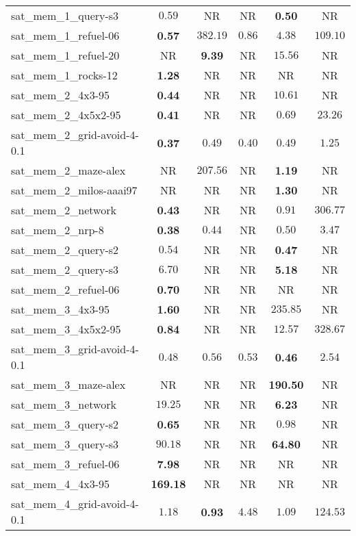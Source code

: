 \begin{tabular}{lccccc}
sat\_mem\_1\_query-s3 & $0.59$ & NR & NR & \textbf{0.50} & NR \\
sat\_mem\_1\_refuel-06 & \textbf{0.57} & $382.19$ & $0.86$ & $4.38$ & $109.10$ \\
sat\_mem\_1\_refuel-20 & NR & \textbf{9.39} & NR & $15.56$ & NR \\
sat\_mem\_1\_rocks-12 & \textbf{1.28} & NR & NR & NR & NR \\
sat\_mem\_2\_4x3-95 & \textbf{0.44} & NR & NR & $10.61$ & NR \\
sat\_mem\_2\_4x5x2-95 & \textbf{0.41} & NR & NR & $0.69$ & $23.26$ \\
sat\_mem\_2\_grid-avoid-4-0.1 & \textbf{0.37} & $0.49$ & $0.40$ & $0.49$ & $1.25$ \\
sat\_mem\_2\_maze-alex & NR & $207.56$ & NR & \textbf{1.19} & NR \\
sat\_mem\_2\_milos-aaai97 & NR & NR & NR & \textbf{1.30} & NR \\
sat\_mem\_2\_network & \textbf{0.43} & NR & NR & $0.91$ & $306.77$ \\
sat\_mem\_2\_nrp-8 & \textbf{0.38} & $0.44$ & NR & $0.50$ & $3.47$ \\
sat\_mem\_2\_query-s2 & $0.54$ & NR & NR & \textbf{0.47} & NR \\
sat\_mem\_2\_query-s3 & $6.70$ & NR & NR & \textbf{5.18} & NR \\
sat\_mem\_2\_refuel-06 & \textbf{0.70} & NR & NR & NR & NR \\
sat\_mem\_3\_4x3-95 & \textbf{1.60} & NR & NR & $235.85$ & NR \\
sat\_mem\_3\_4x5x2-95 & \textbf{0.84} & NR & NR & $12.57$ & $328.67$ \\
sat\_mem\_3\_grid-avoid-4-0.1 & $0.48$ & $0.56$ & $0.53$ & \textbf{0.46} & $2.54$ \\
sat\_mem\_3\_maze-alex & NR & NR & NR & \textbf{190.50} & NR \\
sat\_mem\_3\_network & $19.25$ & NR & NR & \textbf{6.23} & NR \\
sat\_mem\_3\_query-s2 & \textbf{0.65} & NR & NR & $0.98$ & NR \\
sat\_mem\_3\_query-s3 & $90.18$ & NR & NR & \textbf{64.80} & NR \\
sat\_mem\_3\_refuel-06 & \textbf{7.98} & NR & NR & NR & NR \\
sat\_mem\_4\_4x3-95 & \textbf{169.18} & NR & NR & NR & NR \\
sat\_mem\_4\_grid-avoid-4-0.1 & $1.18$ & \textbf{0.93} & $4.48$ & $1.09$ & $124.53$ \\

\end{tabular}
